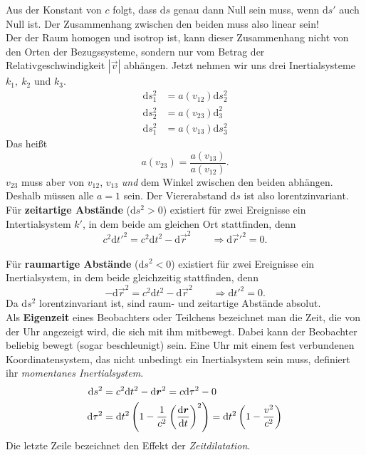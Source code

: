 Aus der Konstant von $c$ folgt, dass $\mathrm{d}s$ genau dann Null sein muss, wenn $\mathrm{d}s'$ auch Null ist. Der Zusammenhang zwischen den beiden muss also linear sein!\\
Der der Raum homogen und isotrop ist, kann dieser Zusammenhang nicht von den Orten der Bezugssysteme, sondern nur vom Betrag der Relativgeschwindigkeit $|\vec{v}|$ abhängen. Jetzt nehmen wir uns drei Inertialsysteme $k_1,\ k_2$ und $k_3$. 
\begin{align*}
\mathrm{d}s_1^2 &= a(v_{12})\mathrm{d}s_2^2\\
\mathrm{d}s_2^2&=a(v_{23})\mathrm{d}_3^2\\
\mathrm{d}s_1^2 &=a(v_{13})\mathrm{d}s_3^2
\end{align*}
Das heißt
\begin{equation*}
a(v_{23})=\frac{a(v_{13})}{a(v_{12})}.
\end{equation*}
$v_{23}$ muss aber von $v_{12}$, $v_{13}$ \emph{und} dem Winkel zwischen den beiden abhängen. Deshalb müssen alle $a=1$ sein. Der Viererabstand $\mathrm{d}s$ ist also lorentzinvariant.\\

Für \textbf{zeitartige Abstände} ($\mathrm{d}s^2>0$) existiert für zwei Ereignisse ein Intertialsystem $k'$, in dem beide am gleichen Ort stattfinden, denn
\begin{equation*}
c^2\mathrm{d}t'^2 = c^2\mathrm{d}t^2 - \mathrm{d}\vec{r}^2 \qquad \Rightarrow \mathrm{d}\vec{r}'^2 = 0.
\end{equation*} 
\ \\

Für \textbf{raumartige Abstände} ($\mathrm{d}s^2<0$) existiert für zwei Ereignisse ein Inertialsystem, in dem beide gleichzeitig stattfinden, denn
\begin{equation*}
-\mathrm{d}\vec{r}^2 =c^2\mathrm{d}t^2-\mathrm{d}\vec{r}^2 \qquad \Rightarrow \mathrm{d}t'^2 =0.
\end{equation*}
Da $\mathrm{d}s^2$ lorentzinvariant ist, sind raum- und zeitartige Abstände absolut.\\

Als \textbf{Eigenzeit} eines Beobachters oder Teilchens bezeichnet man die Zeit, die von der Uhr angezeigt wird, die sich mit ihm mitbewegt. Dabei kann der Beobachter beliebig bewegt (sogar beschleunigt) sein. Eine Uhr mit einem fest verbundenen Koordinatensystem, das nicht unbedingt ein Inertialsystem sein muss, definiert ihr \emph{momentanes Inertialsystem}.
\begin{align*}
\mathrm{d}s^2 &= c^2\mathrm{d}t^2 - \mathrm{d}\bm{r}^2 = c\mathrm{d}\tau^2-0\\
\mathrm{d}\tau^2 &= \mathrm{d}t^2\left(1-\frac{1}{c^2}\left(\frac{\mathrm{d}{\bm{r}}}{\mathrm{d}{t}}\right)^2\right)=\mathrm{d}t^2\left(1-\frac{v^2}{c^2}\right)\\
\end{align*}
Die letzte Zeile bezeichnet den Effekt der \emph{Zeitdilatation}.\\ \linebreak


